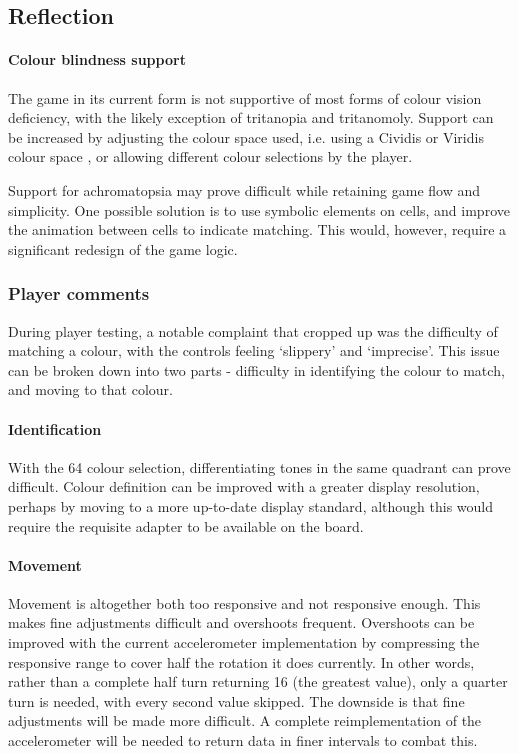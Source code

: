 \subsection{Reflection} 

\paragraph{Colour blindness support}
The game in its current form is not supportive of most forms of colour vision deficiency, with the likely exception of 
tritanopia and tritanomoly. Support can be increased by adjusting the colour space used, i.e. using a 
Cividis or Viridis colour space \cite{Nunez2018}, or allowing different colour selections by the player.

Support for achromatopsia may prove difficult while retaining game flow and simplicity. One possible solution is 
to use symbolic elements on cells, and improve the animation between cells to indicate matching. This would, however, 
require a significant redesign of the game logic. 

\subsubsection{Player comments}
During player testing, a notable complaint that cropped up was the difficulty of matching a colour,
with the controls feeling `slippery' and `imprecise'. 
This issue can be broken down into two parts - difficulty in identifying the colour to match, and moving to that colour. 
\paragraph{Identification} With the 64 colour selection, differentiating tones in the same quadrant 
can prove difficult. Colour definition can be improved with a greater display resolution, perhaps by moving 
to a more up-to-date display standard, although this would require the requisite adapter to be available on the board. 
\paragraph{Movement} Movement is altogether both too responsive and not responsive enough. This makes fine adjustments
difficult and overshoots frequent. Overshoots can be improved with the current accelerometer implementation 
by compressing the responsive range to cover half the rotation it does currently. In other words, rather than a complete 
half turn returning 16 (the greatest value), only a quarter turn is needed, with every second value skipped. The 
downside is that fine adjustments will be made more difficult. A complete reimplementation of the accelerometer 
will be needed to return data in finer intervals to combat this. 

